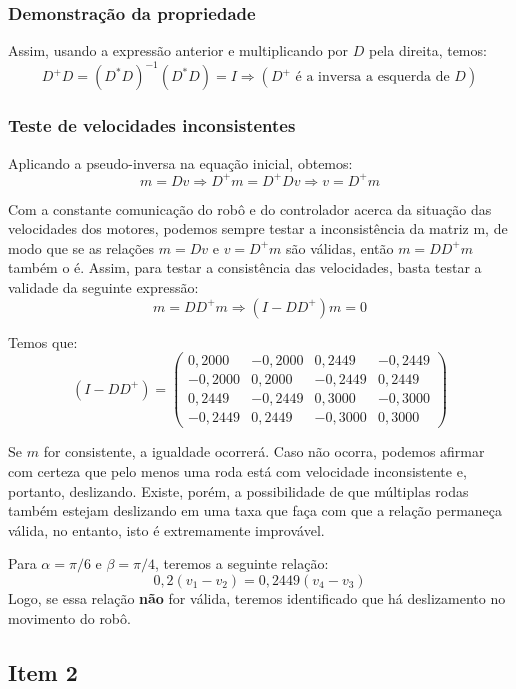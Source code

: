 \documentclass{article}
\begin{document}
\subsubsection{Demonstração da propriedade}

\hspace{1cm} Assim, usando a expressão anterior e multiplicando por $D$ pela direita, temos:
\[D^+D = (D^*D)^{-1}(D^*D) = I \Rightarrow (D^+ \text{ é a inversa a esquerda de }D)\]  

\subsubsection{Teste de velocidades inconsistentes}

\hspace{1cm} Aplicando a pseudo-inversa na equação inicial, obtemos:
\[ m = Dv \Rightarrow D^+m = D^+Dv \Rightarrow v = D^+m\]

Com a constante comunicação do robô e do controlador acerca da situação das velocidades dos motores, podemos sempre testar a inconsistência da matriz m, de modo que se as relações $m = Dv$ e $v = D^+m$ são válidas, então $m = DD^+m$ também o é. Assim, para testar a consistência das velocidades, basta testar a validade da seguinte expressão:
\[ m = DD^+m \Rightarrow (I - DD^+)m = 0\]

Temos que:
\[(I - DD^+)
=
\begin{pmatrix}
  0,2000    &-0,2000    & 0,2449    & -0,2449    \\
 -0,2000 &  0,2000 & -0,2449 & 0,2449 \\
 0,2449 & -0,2449 &  0,3000  & -0,3000 \\
 -0,2449 & 0,2449 & -0,3000  & 0,3000
 \end{pmatrix}
\]


Se $m$ for consistente, a igualdade ocorrerá. Caso não ocorra, podemos afirmar com certeza que pelo menos uma roda está com velocidade inconsistente e, portanto, deslizando. Existe, porém, a possibilidade de que múltiplas rodas também estejam deslizando em uma taxa que faça com que a relação permaneça válida, no entanto, isto é extremamente improvável.

Para $\alpha = \pi/6$ e $\beta = \pi/4$, teremos a seguinte relação:
\[0,2(v_1 - v_2) = 0,2449(v_4 - v_3)\]
Logo, se essa relação \textbf{não} for válida, teremos identificado que há deslizamento no movimento do robô.

\subsection{Item 2}
\end{document}
